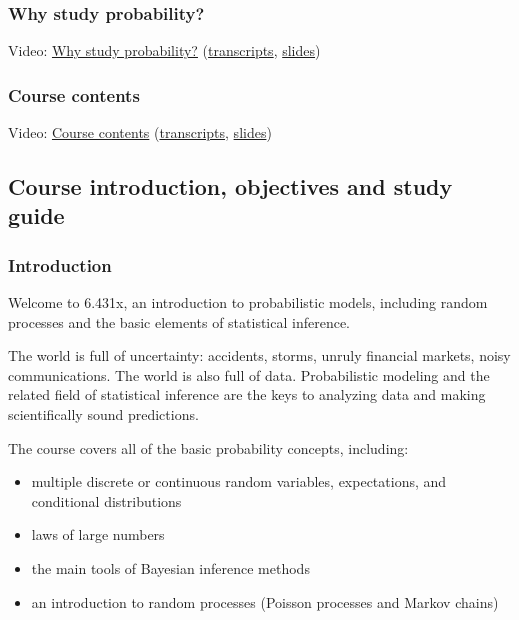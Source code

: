 \documentclass[pdftex, brazil, 12pt, twoside]{article}
\begin{document}
\subsubsection{Why study probability?}
\label{ovw0-co-why}

Video: \href{https://www.youtube.com/watch?v=cvVmmboMiyY}{Why study probability?}
(\href{Unit-0/Overview2\_transcripts.pdf}{transcripts}, \href{Unit-0/Overview2\_slides.pdf}{slides})

\subsubsection{Course contents}
\label{ovw0-co-contents}

Video: \href{https://www.youtube.com/watch?v=6EZKb-Lo9IQ}{Course contents}
(\href{Unit-0/Overview3\_transcripts.pdf}{transcripts}, \href{Unit-0/Overview3\_slides.pdf}{slides})


\subsection{Course introduction, objectives and study guide}
\label{ovw0-ci}

\subsubsection{Introduction}
\label{ovw0-ci-intro}

Welcome to 6.431x, an introduction to probabilistic models, including random
processes and the basic elements of statistical inference.

The world is full of uncertainty: accidents, storms, unruly financial markets,
noisy communications. The world is also full of data. Probabilistic modeling and
the related field of statistical inference are the keys to analyzing data and making
scientifically sound predictions.

The course covers all of the basic probability concepts, including:

\begin{itemize}[noitemsep]
\item multiple discrete or continuous random variables, expectations, and conditional distributions
\item laws of large numbers
\item the main tools of Bayesian inference methods
\item an introduction to random processes (Poisson processes and Markov chains)
\end{itemize}
\end{document}
